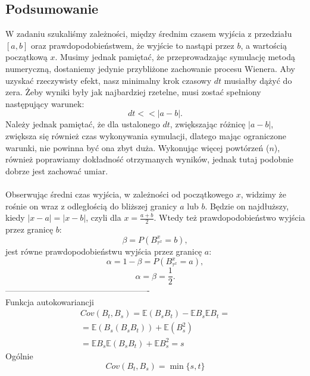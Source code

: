 \documentclass{article}
\theoremstyle{break}
\begin{document}
\subsection*{Podsumowanie}
W zadaniu szukaliśmy zależności, między średnim czasem wyjścia z przedziału $[a,b]$ oraz prawdopodobieństwem, że wyjście to nastąpi przez $b$, a wartością początkową $x$. Musimy jednak pamiętać, że przeprowadzając symulację metodą numeryczną, dostaniemy jedynie przybliżone zachowanie procesu Wienera. Aby uzyskać rzeczywisty efekt, nasz minimalny krok czasowy $dt$ musiałby dążyć do zera. Żeby wyniki były jak najbardziej rzetelne, musi zostać spełniony następujący warunek:
 $$dt<<|a-b|.$$ 
Należy jednak pamiętać, że dla ustalonego $dt$, zwiększając różnicę $|a-b|$, zwiększa się również czas wykonywania symulacji, dlatego mając ograniczone warunki, nie powinna być ona zbyt duża. Wykonując więcej powtórzeń ($n$), również poprawiamy dokładność otrzymanych wyników, jednak tutaj podobnie dobrze jest zachować umiar.
\\ \\
Obserwując średni czas wyjścia, w zależności od początkowego $x$, widzimy że rośnie on wraz z odległością do bliższej granicy $a$ lub $b$. Będzie on najdłuższy, kiedy $|x-a|=|x-b|$, czyli dla $x=\frac{a+b}{2}$. Wtedy też prawdopodobieństwo wyjścia przez granicę $b$:
 $$\beta=P(B_{\tau^x}^x=b),$$
jest równe prawdopodobieństwu wyjścia przez granicę $a$: $$\alpha=1-\beta=P(B_{\tau^x}^x=a),$$
$$\alpha=\beta=\frac{1}{2}.$$
----------------------------------------------------\\
Funkcja autokowariancji
\begin{gather}
	Cov(B_t,B_s)=\mathbb{E}(B_sB_t)-\mathbb{E}B_s\mathbb{E}B_t=\\
	=\mathbb{E}(B_s(B_sB_t))+\mathbb{E}(B_s^2)\\
	=\mathbb{E}B_s\mathbb{E}(B_sB_t)+\mathbb{E}B_s^2=s
\end{gather}
Ogólnie
$$Cov(B_t,B_s)=\min\{s,t\}$$
\end{document}
